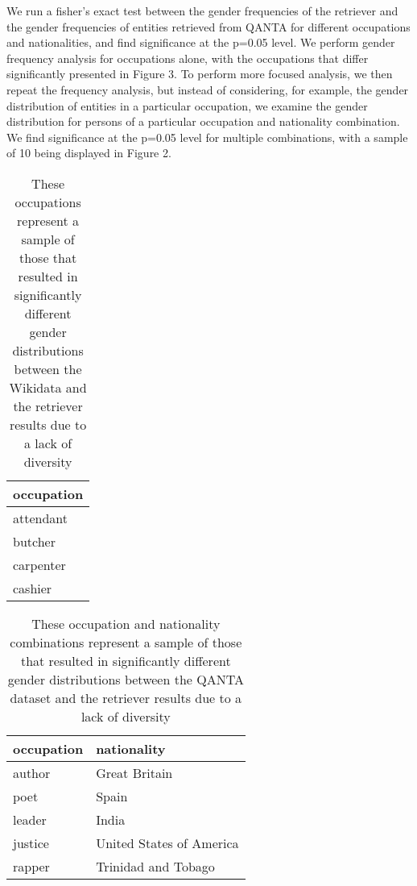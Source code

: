 We run a fisher's exact test between the gender frequencies of the retriever and the gender frequencies of entities retrieved from QANTA for different occupations and nationalities, and find significance at the p=0.05 level.
We perform gender frequency analysis for occupations alone, with the occupations that differ significantly presented in Figure 3.
To perform more focused analysis, we then repeat the frequency analysis, but instead of considering, for example, the gender distribution of entities in a particular occupation, we examine the gender distribution for persons of a particular occupation and nationality combination.  We find significance at the p=0.05 level for multiple combinations, with a sample of 10 being displayed in Figure 2.






\begin{figure*}[h]
	\centering
	\texttt{[image: \\figfile\{unq.png]}}
	\caption{ These occupations resulted in significantly different gender distributions between Wikidata and the retriever results.}
	\label{fig:diffdist}
\end{figure*}

\begin{table}[]
	\begin{tabular}{l}

occupation \\ \hline
attendant  \\
butcher\\
carpenter \\
cashier\\
	\end{tabular}
	\caption{\label{tab:nodiversocc} These occupations represent a sample of those that resulted in significantly different gender distributions between the Wikidata and the retriever results due to a lack of diversity}
\end{table}

\begin{table}[]
	\begin{tabular}{ll}

occupation & nationality\\ \hline
author & Great Britain  \\
poet & Spain\\
leader & India \\
justice &
United States of America \\
rapper & Trinidad and Tobago  \\
	\end{tabular}
	\caption{\label{tab:nationocc} These occupation and nationality combinations represent a sample of those that resulted in significantly different gender distributions between the QANTA dataset and the retriever results due to a lack of diversity}
\end{table}

